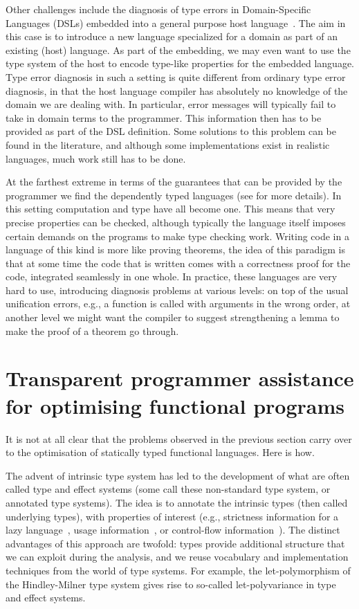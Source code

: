 \documentclass[sigplan,10pt,noacm]{acmart}
\begin{document}
Other challenges include the diagnosis of type errors in 
Domain-Specific Languages (DSLs) embedded into a general purpose host 
language~\cite{}.
The aim in this case is to introduce a new language specialized for a domain
as part of an existing (host) language. As part of the embedding, we may
even want to use the type system of the host to encode type-like properties
for the embedded language. Type error diagnosis in such a setting is quite
different from ordinary type error diagnosis, in that the host language
compiler has absolutely no knowledge of the domain we are dealing with. In
particular, error messages will typically fail to take in domain 
terms to the programmer. This information then has to be provided as part of 
the DSL definition. Some solutions
to this problem can be found in the literature, and although some
implementations exist in realistic languages, much work still has to be done.

At the farthest extreme in terms of the guarantees that can be provided
by the programmer we find the dependently typed languages (see \cite{wouter}
for more details). In this setting computation and type have all become one.
This means that very precise properties can be checked, although
typically the language itself imposes certain demands on the programs to 
make type checking work. Writing code in a language of this kind
is more like proving theorems, the idea of this paradigm is that at some time
the code that is written comes with a correctness proof for the code, integrated
seamlessly in one whole. In practice, these languages are very hard to
use, introducing diagnosis problems at various levels: on top of the 
usual unification errors, e.g., a function is called with arguments
in the wrong order, at another level we might want the compiler
to suggest strengthening a lemma to make the proof of a theorem go through. 

\section{Transparent programmer assistance for optimising functional programs}

It is not at all clear that the problems observed in the previous
section carry over to the optimisation of statically typed functional
languages. Here is how.

The advent of intrinsic type system has led to the development of what
are often called type and effect systems (some call these non-standard
type system, or annotated type systems). The idea is to
annotate the intrinsic types (then called underlying types),
with properties of interest (e.g., strictness information for a lazy
language~\cite{}, usage information~\cite{}, or control-flow information~\cite{}).
The distinct advantages of this approach are twofold: types provide 
additional structure that we can exploit during the analysis, 
and we reuse vocabulary and implementation techniques from the world of 
type systems. For example,
the let-polymorphism of the Hindley-Milner type system gives rise
to so-called let-polyvariance in type and effect systems. 
\end{document}
